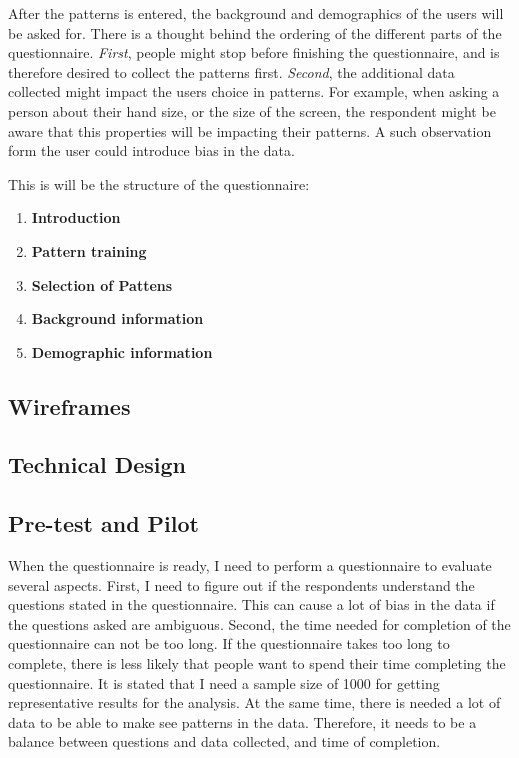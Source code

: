     After the patterns is entered, the background and demographics of the users will be asked for. There is a thought behind the ordering of the different parts of the questionnaire. {\it First}, people might stop before finishing the questionnaire, and is therefore desired to collect the patterns first. {\it Second}, the additional data collected might impact the users choice in patterns. For example, when asking a person about their hand size, or the size of the screen, the respondent might be aware that this properties will be impacting their patterns. A such observation form the user could introduce bias in the data.

    This is will be the structure of the questionnaire:

    \begin{enumerate}
      \item {\bf Introduction}
      \item {\bf Pattern training}
      \item {\bf Selection of Pattens}
      \item {\bf Background information}    
      \item {\bf Demographic information}
    \end{enumerate}

  \clearpage
  \subsection{Wireframes}

  \subsection{Technical Design}\label{sec:technical}

  \subsection{Pre-test and Pilot}\label{sec:pretest}
    When the questionnaire is ready, I need to perform a questionnaire to evaluate several aspects. First, I need to figure out if the respondents understand the questions stated in the questionnaire. This can cause a lot of bias in the data if the questions asked are ambiguous. Second, the time needed for completion of the questionnaire can not be too long. If the questionnaire takes too long to complete, there is less likely that people want to spend their time completing the questionnaire. It is stated that I need a sample size of 1000 for getting representative results for the analysis. At the same time, there is needed a lot of data to be able to make see patterns in the data. Therefore, it needs to be a balance between questions and data collected, and time of completion. 


